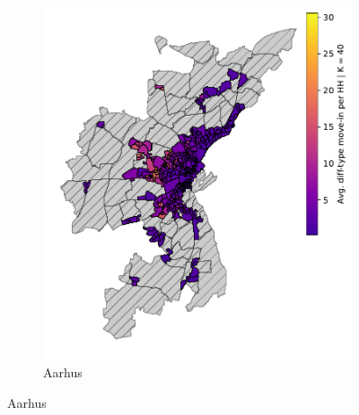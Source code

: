 \documentclass[main.tex]{subfiles}
\begin{document}
\begin{figure}
\begin{subfigure}{.42\textwidth}
	\includegraphics[width=\textwidth]{figs/aarhus_howdy_neighbor_sample.pdf}	
	\caption{Aarhus} \label{fig:incidence_different_type_aarhus}
	\end{subfigure}
    

\end{figure}
\end{document}
